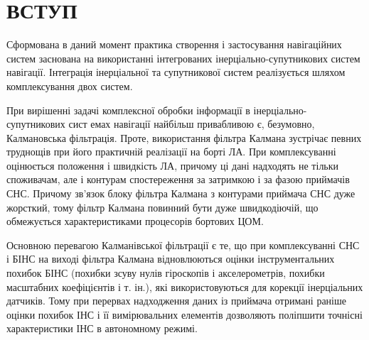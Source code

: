 \section*{ВСТУП}

Сформована в даний момент практика створення і застосування навігаційних 
систем заснована на використанні інтегрованих інерціально-супутникових 
систем навігації. Інтеграція  інерціальної та супутникової систем реалізується шляхом комплексування двох систем. 

При вирішенні задачі комплексної обробки інформації в інерціально-супутникових сист
емах навігації найбільш привабливою є, безумовно, Калмановська фільтрація. Проте, 
використання фільтра Калмана зустрічає певних труднощів при його практичній реалізації 
на борті ЛА. При комплексуванні оцінюється  положення і швидкість ЛА, причому ці дані 
надходять не тільки споживачам, але і контурам спостереження за затримкою  і за фазою  
приймачів СНС. Причому зв'язок блоку фільтра Калмана з контурами приймача СНС дуже жорсткий, 
тому фільтр Калмана повинний бути дуже швидкодіючій, що обмежується характеристиками 
процесорів бортових ЦОМ. 

Основною перевагою Калманівської фільтрації є те, що при комплексуванні СНС і БІНС на 
виході фільтра Калмана відновлюються  оцінки інструментальних похибок БІНС (похибки 
зсуву нулів гіроскопів і акселерометрів, похибки масштабних коефіцієнтів і т. ін.), 
які використовуються для корекції інерціальних датчиків. Тому при перервах надходження 
даних із приймача отримані раніше оцінки похибок ІНС і її вимірювальних елементів дозволяють 
поліпшити точнісні характеристики ІНС в автономному режимі. 

